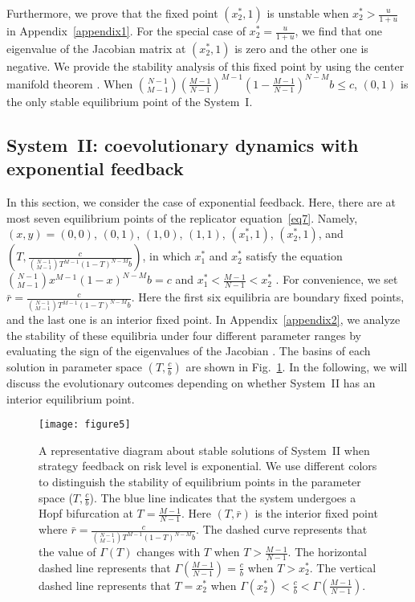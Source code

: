 \documentclass[9pt]{elife}
\begin{document}
Furthermore, we prove that the fixed point $(x_{2}^{*},1)$ is unstable when $x_{2}^{*}>\frac{u}{1+u}$ in Appendix~\ref{appendix1}. For the special case of $x_{2}^{*}=\frac{u}{1+u}$, we find that one eigenvalue of the Jacobian matrix at $(x_{2}^{*},1)$ is zero and the other one is negative. We provide the stability analysis of this fixed point by using the center manifold theorem \citep{KhalilHK1996}. When $\binom{N-1}{M-1}(\frac{M-1}{N-1})^{M-1}(1-\frac{M-1}{N-1})^{N-M}b\leq c$, $(0, 1)$ is the only stable equilibrium point of the System~I.

\subsection{System~II: coevolutionary dynamics with exponential feedback}

In this section, we consider the case of exponential feedback. Here, there are at most seven equilibrium points of the replicator equation~\eqref{eq7}. Namely, $(x, y)=(0, 0)$, $(0, 1)$, $(1, 0)$, $(1, 1)$, $(x_{1}^{*}, 1)$, $(x_{2}^{*}, 1)$, and $(T, \frac{c}{\binom{N-1}{M-1} T^{M-1} (1-T)^{N-M} b})$, in which $x_{1}^{*}$ and $x_{2}^{*}$ satisfy the equation $\binom{N-1}{M-1}x^{M-1}(1-x)^{N-M} b=c$ and $x_{1}^{*}<\frac{M-1}{N-1}<x_{2}^{*}$ \citep{santos2011risk}. For convenience, we set $\bar{r}=\frac{c}{\binom{N-1}{M-1}T^{M-1}(1-T)^{N-M} b}$. Here the first six equilibria are boundary fixed points, and the last one is an interior fixed point. In Appendix~\ref{appendix2}, we analyze the stability of these equilibria under four different parameter ranges by evaluating the sign of the eigenvalues of the Jacobian \citep{KhalilHK1996}. The basins of each solution in parameter space $(T, \frac{c}{b})$ are shown in Fig.~\ref{fig5}. In the following, we will discuss the evolutionary outcomes depending on whether System~II has an interior equilibrium point.

\begin{figure}[h!]
\texttt{[image: figure5]}
\caption{A representative diagram about stable solutions of System~II when strategy feedback on risk level is exponential. We use different colors to distinguish the stability of equilibrium points in the parameter space ($T, \frac{c}{b}$). The blue line indicates that the system undergoes a Hopf bifurcation at $T=\frac{M-1}{N-1}$. Here $(T, \bar{r})$ is the interior fixed point where $\bar{r}=\frac{c}{\binom{N-1}{M-1}T^{M-1}(1-T)^{N-M} b}$. The dashed curve represents that the value of $\Gamma(T)$ changes with $T$ when $T>\frac{M-1}{N-1}$. The horizontal dashed line represents that $\Gamma(\frac{M-1}{N-1})=\frac{c}{b}$ when $T>x_{2}^{*}$. The vertical dashed line represents that $T=x_{2}^{*}$ when $\Gamma(x_{2}^{*})<\frac{c}{b}<\Gamma(\frac{M-1}{N-1})$.}
\label{fig5}
\end{figure}
\end{document}
